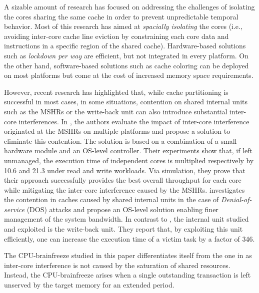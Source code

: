     A sizable amount of research has focused on addressing the challenges of isolating the cores sharing the same cache in order to prevent unpredictable temporal behavior.
    Most of this research \cite{Mancuso2013RealtimeCM, 6755286} has aimed at \emph{spacially isolating} the cores (i.e., avoiding inter-core cache line eviction by constraining each core data and instructions in a specific region of the shared cache).
    Hardware-based solutions such as \emph{lockdown per way} \cite{Giovani_cahe_partitioning_survey} are efficient, but not integrated in every platform.
    On the other hand, software-based solutions such as cache coloring \cite{Mancuso2013RealtimeCM, determ_virt} can be deployed on most platforms but come at the cost of increased memory space requirements.

    However, recent research \cite{Valsan2017AddressingIC, Heechul_DDOS_attacks_on_shared_cache} has highlighted that, while cache partitioning is successful in most cases, in some situations, contention on shared internal units such as the MSHRs or the write-back unit can also introduce substantial inter-core interferences.
    In \cite{Valsan2017AddressingIC}, the authors evaluate the impact of inter-core interference originated at the MSHRs on multiple platforms and propose a solution to eliminate this contention. The solution is based on a combination of a small hardware module and an OS-level controller.
    Their experiments show that, if left unmanaged, the execution time of independent cores is multiplied respectively by 10.6 and 21.3 under read and write workloads.
    Via simulation, they prove that their approach successfully provides the best overall throughput for each core while mitigating the inter-core interference caused by the MSHRs.
    \cite{Heechul_DDOS_attacks_on_shared_cache} investigates the contention in caches caused by shared internal units in the case of \emph{Denial-of-service} (DOS) attacks and propose an OS-level solution enabling finer management of the system bandwidth.
    In contrast to \cite{Valsan2017AddressingIC}, the internal unit studied and exploited is the write-back unit.
    They report that, by exploiting this unit efficiently, one can increase the execution time of a victim task by a factor of 346.

    The CPU-brainfreeze studied in this paper differentiates itself from the one in \cite{Valsan2017AddressingIC, Heechul_DDOS_attacks_on_shared_cache} as inter-core interference is not caused by the saturation of shared resources. Instead, the CPU-brainfreeze arises when a single outstanding transaction is left unserved by the target memory for an extended period.
